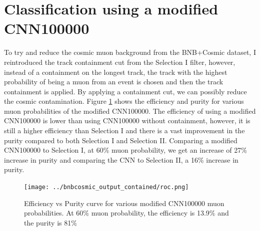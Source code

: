 \newpage

\section{Classification using a modified CNN100000}
To try and reduce the cosmic muon background from the BNB+Cosmic dataset, I reintroduced the track containment cut from the Selection I filter, however, instead of a containment on the longest track, the track with the highest probability of being a muon from an event is chosen and then the track containment is applied. By applying a containment cut, we can possibly reduce the cosmic contamination. Figure \ref{fig:roc_modified} shows the efficiency and purity for various muon probabilities of the modified CNN100000. The efficiency of using a modified CNN100000 is lower than using CNN100000 without containment, however, it is still a higher efficiency than Selection I and there is a vast improvement in the purity compared to both Selection I and Selection II. Comparing a modified CNN100000 to Selection I, at 60\% muon probability, we get an increase of 27\% increase in purity and comparing the CNN to Selection II, a 16\% increase in purity. 

\begin{figure}[htp!]
\centering
\texttt{[image: ../bnbcosmic\_output\_contained/roc.png]}
\caption{Efficiency vs Purity curve for various modified CNN100000 muon probabilities. At 60\% muon probability, the efficiency is 13.9\% and the purity is 81\%} 
\label{fig:roc_modified}
\end{figure}

